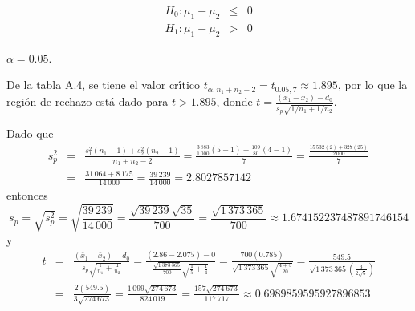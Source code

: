 \begin{solucion}
 \begin{hipotesis}
  \begin{eqnarray*}
   H_0: \mu_1 - \mu_2 & \leq & 0 \\
   H_1: \mu_1 - \mu_2 &   >  & 0
  \end{eqnarray*}
 \end{hipotesis}

 \begin{significancia}
  $\alpha = 0.05$.
 \end{significancia}

 \begin{region}
  De la tabla A.4, se tiene el valor cr\'{\i}tico
  $t_{\alpha,n_1+n_2-2} = t_{0.05,7} \approx 1.895$,
  por lo que la regi\'on de rechazo est\'a dado para $t > 1.895$,
  donde
  $t=\frac{\left(\bar{x}_1-\bar{x}_2\right)-d_0}{s_p\sqrt{1/n_1+1/n_2}}$.
 \end{region}

 \begin{estadistico}
  Dado que
  \begin{eqnarray*}
   s_p^2 & = &
   \frac{s_1^2\left(n_1-1\right) +s_2^2\left(n_2-1\right)}{n_1+n_2-2}
   = \frac{\frac{3\,883}{1\,000}(5-1)+\frac{109}{80}(4-1)}{7}
   = \frac{\frac{15\,532(2) + 327(25)}{2\,000}}{7} \\
   & = & \frac{31\,064 + 8\,175}{14\,000}
   = \frac{39\,239}{14\,000}
   = 2.8027\overline{857142}
  \end{eqnarray*}
  entonces
  \begin{equation*}
   s_p = \sqrt{s_p^2} = \sqrt{\frac{39\,239}{14\,000}}
   = \frac{\sqrt{39\,239}\sqrt{35}}{700}
   = \frac{\sqrt{1\,373\,365}}{700}
   \approx 1.674152237487891746154                                                                                                                                                                                                                                                                                                                                                                                                                                                                                                                                  
  \end{equation*}
  y
  \begin{eqnarray*}
   t & = &
   \frac{ \left( \bar{x}_1 - \bar{x}_2 \right) - d_0
   }{
   s_p \sqrt{ \frac{1}{n_1} + \frac{1}{n_2} }
   }
   =
   \frac{
   \left( 2.86 - 2.075 \right) - 0
   }{
   \frac{\sqrt{1\,373\,365}}{700}\sqrt{\frac{1}{5}+\frac{1}{4}}
   }
   = \frac{700(0.785)}{\sqrt{1\,373\,365}\sqrt{\frac{4+5}{20}}}
   = \frac{549.5}{\sqrt{1\,373\,365}\left( \frac{3}{2\sqrt{5}} \right)}
   \\
   & = & \frac{2(549.5)}{3\sqrt{274\,673}}
   = \frac{1\,099\sqrt{274\,673}}{824\,019}
   = \frac{157\sqrt{274\,673}}{117\,717}
   \approx 0.6989859595927896853
  \end{eqnarray*}
 \end{estadistico}


\end{solucion}
